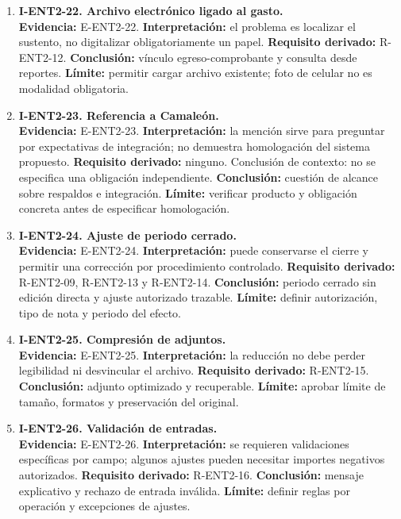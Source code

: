 {\begin{enumerate}
  \item \textbf{I-ENT2-22. Archivo electrónico ligado al gasto.}\\
  \textbf{Evidencia:} E-ENT2-22. \textbf{Interpretación:} el problema es
  localizar el sustento, no digitalizar obligatoriamente un papel.
  \textbf{Requisito derivado:} R-ENT2-12. \textbf{Conclusión:} vínculo
  egreso-comprobante y consulta desde reportes. \textbf{Límite:} permitir
  cargar archivo existente; foto de celular no es modalidad obligatoria.

  \item \textbf{I-ENT2-23. Referencia a Camaleón.}\\
  \textbf{Evidencia:} E-ENT2-23. \textbf{Interpretación:} la mención sirve
  para preguntar por expectativas de integración; no demuestra homologación
  del sistema propuesto. \textbf{Requisito derivado:} ninguno. Conclusión de
  contexto: no se especifica una obligación independiente.
  \textbf{Conclusión:} cuestión de alcance sobre respaldos e integración.
  \textbf{Límite:} verificar producto y obligación concreta antes de
  especificar homologación.

  \item \textbf{I-ENT2-24. Ajuste de periodo cerrado.}\\
  \textbf{Evidencia:} E-ENT2-24. \textbf{Interpretación:} puede conservarse
  el cierre y permitir una corrección por procedimiento controlado.
  \textbf{Requisito derivado:} R-ENT2-09, R-ENT2-13 y R-ENT2-14.
  \textbf{Conclusión:} periodo cerrado sin edición directa y ajuste
  autorizado trazable. \textbf{Límite:} definir autorización, tipo de nota y
  periodo del efecto.

  \item \textbf{I-ENT2-25. Compresión de adjuntos.}\\
  \textbf{Evidencia:} E-ENT2-25. \textbf{Interpretación:} la reducción no
  debe perder legibilidad ni desvincular el archivo. \textbf{Requisito
  derivado:} R-ENT2-15. \textbf{Conclusión:} adjunto optimizado y
  recuperable. \textbf{Límite:} aprobar límite de tamaño, formatos y
  preservación del original.

  \item \textbf{I-ENT2-26. Validación de entradas.}\\
  \textbf{Evidencia:} E-ENT2-26. \textbf{Interpretación:} se requieren
  validaciones específicas por campo; algunos ajustes pueden necesitar
  importes negativos autorizados. \textbf{Requisito derivado:} R-ENT2-16.
  \textbf{Conclusión:} mensaje explicativo y rechazo de entrada inválida.
  \textbf{Límite:} definir reglas por operación y excepciones de ajustes.


\end{enumerate}}

